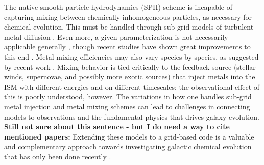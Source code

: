 \documentclass[twocolumn]{aastex61}
\begin{document}

The native smooth particle hydrodynamics (SPH) scheme is incapable of capturing mixing between chemically inhomogeneous particles, as necessary for chemical evolution. This must be handled through sub-grid models of turbulent metal diffusion \citep[e.g.][]{Shen2010, Shen2013,Brook2014,Su2017a}. Even more, a given parameterization is not necessarily applicable generally \citep{Revaz2016}, though recent studies have shown great improvements to this end \citep{Escala2017}. Metal mixing efficiencies may also vary species-by-species, as suggested by recent work \citep[e.g.][]{Cohen2013, Roederer2014, FrebelNorris2015, Hirai2017, Cote2017}. Mixing behavior is tied critically to the feedback source (stellar winds, supernovae, and possibly more exotic sources) 
    that inject metals into 
the ISM with different energies and on different timescales; the observational effect of this is poorly understood, however. The variations in how one handles sub-grid metal injection and metal mixing schemes can lead to challenges in connecting models to observations and the fundamental physics that drives galaxy evolution. \textbf{Still not sure about this sentence - but I do need a way to cite mentioned papers:} Extending these models to a grid-based code is a valuable and complementary approach towards investigating galactic chemical evolution that has only been done recently \citep{Few2012,Few2014,Vorobyov2015}.
\end{document}
